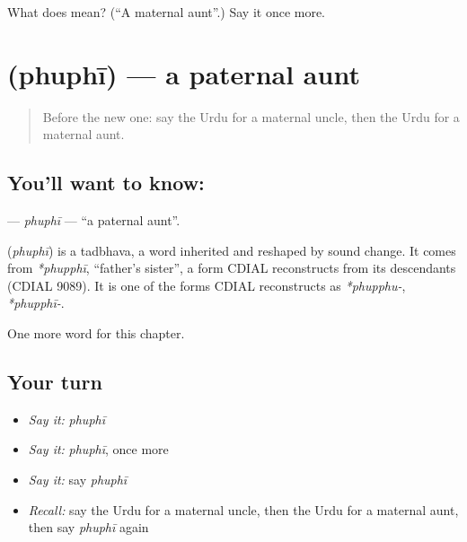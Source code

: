 \begin{tcolorbox}[breakable,colback=teal!4,colframe=teal!35!black,title={Before you move on}]
What does  mean? (\textquotedblleft{}A maternal aunt\textquotedblright{}.) Say it once more.
\end{tcolorbox}
\section[\texorpdfstring{\ur{پھوپھی} (phuphī)}{پھوپھی (phuphī)}]{ (phuphī) — a paternal aunt}

\label{lesson:UR-C203-phuphi}



\begin{quote}
Before the new one: say the Urdu for a maternal uncle, then the Urdu for a maternal aunt.
\end{quote}

\subsection*{You'll want to know: }
\textbf{} — \emph{phuphī} — \textquotedblleft{}a paternal aunt\textquotedblright{}.

\begin{cousinweb}
\textbf{} (\emph{phuphī}) is a tadbhava, a word inherited and reshaped by sound change. It comes from \emph{*phupphī}, \textquotedblleft{}father's sister\textquotedblright{}, a form CDIAL reconstructs from its descendants (CDIAL 9089). It is one of the forms CDIAL reconstructs as \emph{*phupphu-}, \emph{*phupphī-}.
\end{cousinweb}

\begin{grammarlens}[title={What you've built}]
One more word for this chapter.
\end{grammarlens}

\subsection*{Your turn}
\begin{itemize}
\raggedright
  \item \emph{Say it:} \emph{phuphī}
  \item \emph{Say it:} \emph{phuphī}, once more
  \item \emph{Say it:} say \emph{phuphī}
  \item \emph{Recall:} say the Urdu for a maternal uncle, then the Urdu for a maternal aunt, then say \emph{phuphī} again
\end{itemize}

